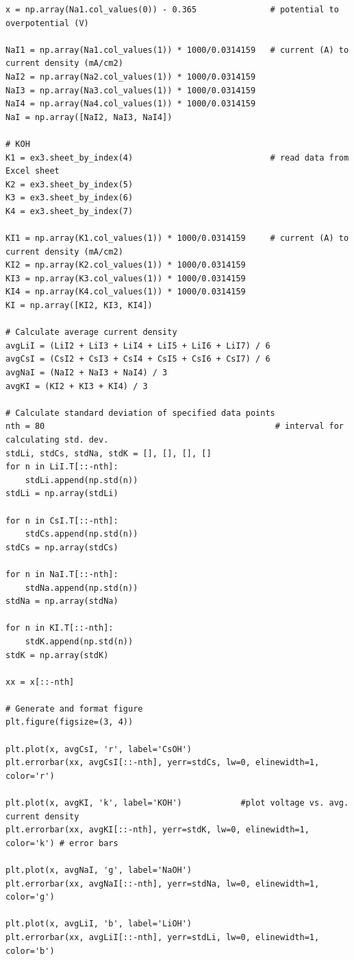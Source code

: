 \documentclass[journal=jpccck,manuscript=suppinfo,email=true]{achemso}
\begin{document}
\begin{verbatim}
x = np.array(Na1.col_values(0)) - 0.365               # potential to overpotential (V)

NaI1 = np.array(Na1.col_values(1)) * 1000/0.0314159   # current (A) to current density (mA/cm2)
NaI2 = np.array(Na2.col_values(1)) * 1000/0.0314159
NaI3 = np.array(Na3.col_values(1)) * 1000/0.0314159
NaI4 = np.array(Na4.col_values(1)) * 1000/0.0314159
NaI = np.array([NaI2, NaI3, NaI4])

# KOH
K1 = ex3.sheet_by_index(4)                            # read data from Excel sheet
K2 = ex3.sheet_by_index(5)
K3 = ex3.sheet_by_index(6)
K4 = ex3.sheet_by_index(7)

KI1 = np.array(K1.col_values(1)) * 1000/0.0314159     # current (A) to current density (mA/cm2)
KI2 = np.array(K2.col_values(1)) * 1000/0.0314159
KI3 = np.array(K3.col_values(1)) * 1000/0.0314159
KI4 = np.array(K4.col_values(1)) * 1000/0.0314159
KI = np.array([KI2, KI3, KI4])

# Calculate average current density
avgLiI = (LiI2 + LiI3 + LiI4 + LiI5 + LiI6 + LiI7) / 6
avgCsI = (CsI2 + CsI3 + CsI4 + CsI5 + CsI6 + CsI7) / 6
avgNaI = (NaI2 + NaI3 + NaI4) / 3
avgKI = (KI2 + KI3 + KI4) / 3

# Calculate standard deviation of specified data points
nth = 80                                               # interval for calculating std. dev.
stdLi, stdCs, stdNa, stdK = [], [], [], []
for n in LiI.T[::-nth]:
    stdLi.append(np.std(n))
stdLi = np.array(stdLi)

for n in CsI.T[::-nth]:
    stdCs.append(np.std(n))
stdCs = np.array(stdCs)

for n in NaI.T[::-nth]:
    stdNa.append(np.std(n))
stdNa = np.array(stdNa)

for n in KI.T[::-nth]:
    stdK.append(np.std(n))
stdK = np.array(stdK)

xx = x[::-nth]

# Generate and format figure
plt.figure(figsize=(3, 4))

plt.plot(x, avgCsI, 'r', label='CsOH')
plt.errorbar(xx, avgCsI[::-nth], yerr=stdCs, lw=0, elinewidth=1, color='r')

plt.plot(x, avgKI, 'k', label='KOH')            #plot voltage vs. avg. current density
plt.errorbar(xx, avgKI[::-nth], yerr=stdK, lw=0, elinewidth=1, color='k') # error bars

plt.plot(x, avgNaI, 'g', label='NaOH')
plt.errorbar(xx, avgNaI[::-nth], yerr=stdNa, lw=0, elinewidth=1, color='g')

plt.plot(x, avgLiI, 'b', label='LiOH')
plt.errorbar(xx, avgLiI[::-nth], yerr=stdLi, lw=0, elinewidth=1, color='b')


\end{verbatim}
\end{document}
